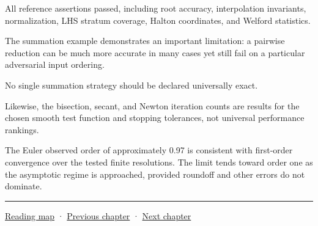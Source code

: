 All reference assertions passed, including root accuracy, interpolation invariants, normalization, LHS stratum coverage, Halton coordinates, and Welford statistics.

The summation example demonstrates an important limitation: a pairwise reduction can be much more accurate in many cases yet still fail on a particular adversarial input ordering.

No single summation strategy should be declared universally exact.

Likewise, the bisection, secant, and Newton iteration counts are results for the chosen smooth test function and stopping tolerances, not universal performance rankings.

The Euler observed order of approximately 0.97 is consistent with first-order convergence over the tested finite resolutions. The limit tends toward order one as the asymptotic regime is approached, provided roundoff and other errors do not dominate.

\begin{center}\rule{0.5\linewidth}{0.5pt}\end{center}

\hyperref[volume-reading-map]{Reading map} · \hyperref[02-foundations-ii-ch030-monte-carlo-estimates-and-uncertainty-metrics]{Previous chapter} · \hyperref[02-foundations-ii-ch032-geometry-becomes-an-image-and-an-inverse-problem]{Next chapter}
